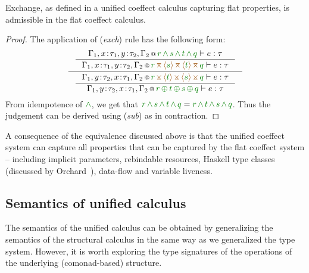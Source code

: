 \begin{lemma}
\label{thm:unified-rev-exch}
Exchange, as defined in a unified coeffect calculus capturing flat properties, is admissible in 
the flat coeffect calculus.
\end{lemma}
\begin{proof}
The application of (\emph{exch}) rule has the following form:
\begin{equation*}
\inference
 {\inference
    {\coctx{\Gamma_1,x\!:\!\tau_1,y\!:\!\tau_2,\Gamma_2}{\cclrd{r} \,\czip\, \cclrd{s} \,\czip\, \cclrd{t} \,\czip\, \cclrd{q}} \vdash e : \tau}
    {\coctx{\Gamma_1,x\!:\!\tau_1,y\!:\!\tau_2,\Gamma_2}{\cclrd{r} \,\azip\, \alift{\cclrd{s}} \,\azip\, \alift{\cclrd{t}} \,\azip\, \cclrd{q}} \vdash e : \tau} }
 {\inference
    {\coctx{\Gamma_1,y\!:\!\tau_2,x\!:\!\tau_1,\Gamma_2}{\cclrd{r} \,\apar\, \alift{\cclrd{t}} \,\apar\, \alift{\cclrd{s}} \,\apar\, \cclrd{q}} \vdash e : \tau}
    {\coctx{\Gamma_1,y\!:\!\tau_2,x\!:\!\tau_1,\Gamma_2}{\cclrd{r} \,\cpar\, \cclrd{t} \,\cpar\, \cclrd{s} \,\cpar\, \cclrd{q}} \vdash e : \tau} }
\end{equation*}
%
From idempotence of $\czip$, we get that $\cclrd{r} \,\czip\, \cclrd{s} \,\czip\, \cclrd{t} \,\czip\, \cclrd{q} =
\cclrd{r} \,\czip\, \cclrd{t} \,\czip\, \cclrd{s} \,\czip\, \cclrd{q}$. Thus the judgement can be derived using
(\emph{sub}) as in contraction.
\end{proof}

\noindent
A consequence of the equivalence discussed above is that the unified coeffect system can capture 
all properties that can be captured by the flat coeffect system -- including implicit parameters,
rebindable resources, Haskell type classes (discussed by Orchard~\cite{comonads-dom-thesis}),
data-flow and variable liveness.


\subsection{Semantics of unified calculus}
\label{sec:unified-semantics}

The semantics of the unified calculus can be obtained by generalizing the semantics of the structural
calculus in the same way as we generalized the type system. However, it is worth exploring the type 
signatures of the operations of the underlying (comonad-based) structure.

